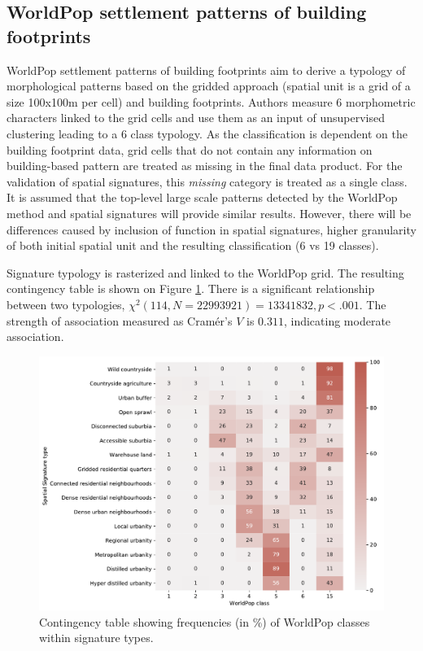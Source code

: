 \subsection*{WorldPop settlement patterns of building footprints}
WorldPop settlement patterns of building footprints aim to derive a typology of
morphological patterns based on the gridded approach (spatial unit is a grid of a size
100x100m per cell) and building footprints. Authors measure 6 morphometric characters
linked to the grid cells and use them as an input of unsupervised clustering leading to
a 6 class typology.
As the classification is dependent on the building footprint data, grid cells that do
not contain any information on building-based pattern are treated as missing in the
final data product. For the validation of spatial signatures, this \textit{missing}
category is treated as a single class. It is assumed that the top-level large scale
patterns detected by the WorldPop method and spatial signatures will provide similar
results. However, there will be differences caused by inclusion of function in spatial
signatures, higher granularity of both initial spatial unit and the resulting
classification (6 vs 19 classes).

Signature typology is rasterized and linked to the WorldPop grid. The resulting
contingency table is shown on Figure \ref{fig:crosstab_worldpop}. There is a significant relationship between
two typologies, $\chi^{2} (114, N = 22993921) = 13341832, p < .001$. The strength of
association measured as Cramér's $V$ is $0.311$, indicating moderate association.

\begin{figure}
    \centering
    \includegraphics[width=.8\linewidth]{fig/crosstab_worldpop.pdf}
    \caption{Contingency table showing frequencies (in \%) of WorldPop classes within signature types.}
    \label{fig:crosstab_worldpop}
\end{figure}

